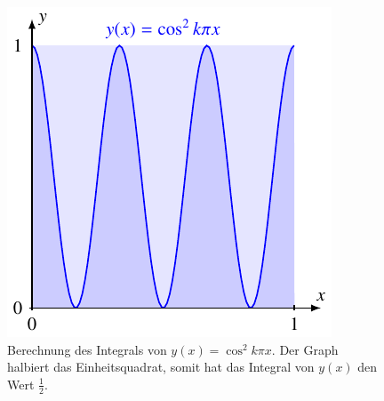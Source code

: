 %
%
%
\begin{figure}
\centering
\includegraphics{chapters/050-nebenbedingungen/images/cos2.pdf}
\caption{Berechnung des Integrals von $y(x)=\cos^2 k\pi x$.
Der Graph halbiert das Einheitsquadrat, somit hat das Integral von $y(x)$
den Wert $\frac12$.
\label{buch:nebenbedingungen:aufgabe:501:fig:cos2}}
\end{figure}
